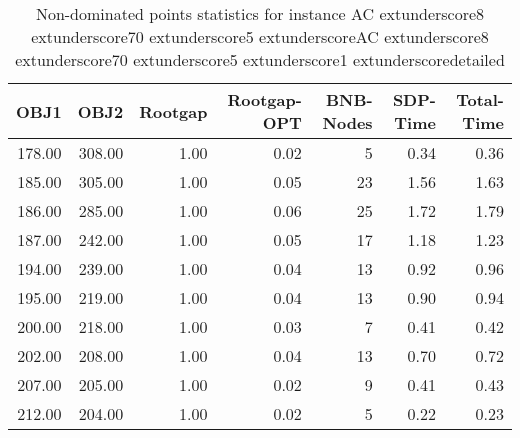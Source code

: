 \begin{table}
\caption{Non-dominated points statistics for instance AC	extunderscore8	extunderscore70	extunderscore5	extunderscoreAC	extunderscore8	extunderscore70	extunderscore5	extunderscore1	extunderscoredetailed}
\label{tab:stats/AC_8_70_5_AC_8_70_5_1_detailed}
\begin{tabular}{rrrrrrr}
\toprule
OBJ1 & OBJ2 & Rootgap & Rootgap-OPT & BNB-Nodes & SDP-Time & Total-Time \\
\midrule
178.00 & 308.00 & 1.00 & 0.02 & 5 & 0.34 & 0.36 \\
185.00 & 305.00 & 1.00 & 0.05 & 23 & 1.56 & 1.63 \\
186.00 & 285.00 & 1.00 & 0.06 & 25 & 1.72 & 1.79 \\
187.00 & 242.00 & 1.00 & 0.05 & 17 & 1.18 & 1.23 \\
194.00 & 239.00 & 1.00 & 0.04 & 13 & 0.92 & 0.96 \\
195.00 & 219.00 & 1.00 & 0.04 & 13 & 0.90 & 0.94 \\
200.00 & 218.00 & 1.00 & 0.03 & 7 & 0.41 & 0.42 \\
202.00 & 208.00 & 1.00 & 0.04 & 13 & 0.70 & 0.72 \\
207.00 & 205.00 & 1.00 & 0.02 & 9 & 0.41 & 0.43 \\
212.00 & 204.00 & 1.00 & 0.02 & 5 & 0.22 & 0.23 \\
\bottomrule
\end{tabular}
\end{table}
